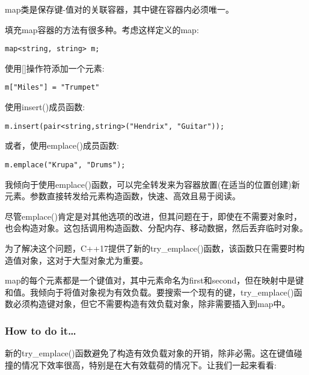 
map类是保存键-值对的关联容器，其中键在容器内必须唯一。

填充map容器的方法有很多种。考虑这样定义的map:

\begin{lstlisting}[style=styleCXX]
map<string, string> m;
\end{lstlisting}

使用[]操作符添加一个元素:

\begin{lstlisting}[style=styleCXX]
m["Miles"] = "Trumpet"
\end{lstlisting}

使用insert()成员函数:

\begin{lstlisting}[style=styleCXX]
m.insert(pair<string,string>("Hendrix", "Guitar"));
\end{lstlisting}

或者，使用emplace()成员函数:

\begin{lstlisting}[style=styleCXX]
m.emplace("Krupa", "Drums");
\end{lstlisting}

我倾向于使用emplace()函数，可以完全转发来为容器放置(在适当的位置创建)新元素。参数直接转发给元素构造函数，快速、高效且易于阅读。
 
尽管emplace()肯定是对其他选项的改进，但其问题在于，即使在不需要对象时，也会构造对象。这包括调用构造函数、分配内存、移动数据，然后丢弃临时对象。

为了解决这个问题，C++17提供了新的try\_emplace()函数，该函数只在需要时构造值对象，这对于大型对象尤为重要。

\begin{tcolorbox}[colback=webgreen!5!white,colframe=webgreen!75!black,title=Note]
map的每个元素都是一个键值对，其中元素命名为first和second，但在映射中是键和值。我倾向于将值对象视为有效负载。要搜索一个现有的键，try\_emplace()函数必须构造键对象，但它不需要构造有效负载对象，除非需要插入到map中。
\end{tcolorbox}

\subsubsection{How to do it…}

新的try\_emplace()函数避免了构造有效负载对象的开销，除非必需。这在键值碰撞的情况下效率很高，特别是在大有效载荷的情况下。让我们一起来看看:

